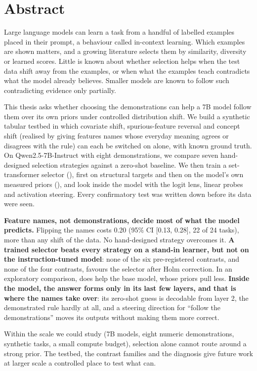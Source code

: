 \chapter*{Abstract}

Large language models can learn a task from a handful of labelled examples placed in their prompt, a behaviour called in-context learning.
Which examples are shown matters, and a growing literature selects them by similarity, diversity or learned scores.
Little is known about whether selection helps when the test data shift away from the examples, or when what the examples teach contradicts what the model already believes.
Smaller models are known to follow such contradicting evidence only partially.

This thesis asks whether choosing the demonstrations can help a 7B model follow them over its own priors under controlled distribution shift.
We build a synthetic tabular testbed in which covariate shift, spurious-feature reversal and concept shift (realised by giving features names whose everyday meaning agrees or disagrees with the rule) can each be switched on alone, with known ground truth.
On Qwen2.5-7B-Instruct with eight demonstrations, we compare seven hand-designed selection strategies against a zero-shot baseline.
We then train a set-transformer selector (\sata), first on structural targets and then on the model's own measured priors (\satami), and look inside the model with the logit lens, linear probes and activation steering.
Every confirmatory test was written down before its data were seen.

\textbf{Feature names, not demonstrations, decide most of what the model predicts.}
Flipping the names costs 0.20 \AUROC (95\% CI [0.13, 0.28], 22 of 24 tasks), more than any shift of the data.
No hand-designed strategy overcomes it.
\textbf{A trained selector beats every strategy on a stand-in learner, but not on the instruction-tuned model}: none of the six pre-registered \sata contrasts, and none of the four \satami contrasts, favours the selector after Holm correction.
In an exploratory comparison, \sata does help the base model, whose priors pull less.
\textbf{Inside the model, the answer forms only in its last few layers, and that is where the names take over}: its zero-shot guess is decodable from layer 2, the demonstrated rule hardly at all, and a steering direction for ``follow the demonstrations'' moves its outputs without making them more correct.

Within the scale we could study (7B models, eight numeric demonstrations, synthetic tasks, a small compute budget), selection alone cannot route around a strong prior.
The testbed, the contrast families and the diagnosis give future work at larger scale a controlled place to test what can.
